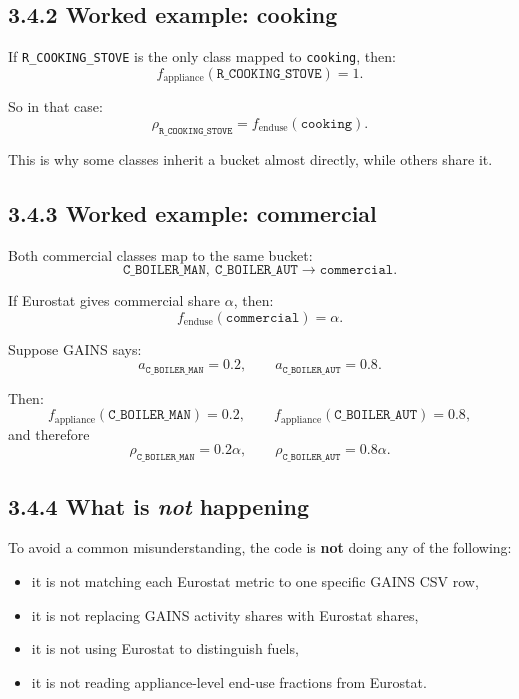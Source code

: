 \documentclass[11pt,a4paper]{article}
\begin{document}
\subsection{3.4.2 Worked example: cooking}

If \texttt{R\_COOKING\_STOVE} is the only class mapped to \texttt{cooking}, then:
\[
f_{\mathrm{appliance}}(\texttt{R\_COOKING\_STOVE}) = 1.
\]

So in that case:
\[
\rho_{\texttt{R\_COOKING\_STOVE}}
= f_{\mathrm{enduse}}(\texttt{cooking}).
\]

This is why some classes inherit a bucket almost directly, while others share it.

\subsection{3.4.3 Worked example: commercial}

Both commercial classes map to the same bucket:
\[
\texttt{C\_BOILER\_MAN},\ \texttt{C\_BOILER\_AUT}
\rightarrow \texttt{commercial}.
\]

If Eurostat gives commercial share $\alpha$, then:
\[
f_{\mathrm{enduse}}(\texttt{commercial}) = \alpha.
\]

Suppose GAINS says:
\[
a_{\texttt{C\_BOILER\_MAN}} = 0.2,
\qquad
a_{\texttt{C\_BOILER\_AUT}} = 0.8.
\]

Then:
\[
f_{\mathrm{appliance}}(\texttt{C\_BOILER\_MAN}) = 0.2,
\qquad
f_{\mathrm{appliance}}(\texttt{C\_BOILER\_AUT}) = 0.8,
\]
and therefore
\[
\rho_{\texttt{C\_BOILER\_MAN}} = 0.2\alpha,
\qquad
\rho_{\texttt{C\_BOILER\_AUT}} = 0.8\alpha.
\]

\subsection{3.4.4 What is \emph{not} happening}

To avoid a common misunderstanding, the code is \textbf{not} doing any of the following:

\begin{itemize}[leftmargin=1.4em]
  \item it is not matching each Eurostat metric to one specific GAINS CSV row,
  \item it is not replacing GAINS activity shares with Eurostat shares,
  \item it is not using Eurostat to distinguish fuels,
  \item it is not reading appliance-level end-use fractions from Eurostat.
\end{itemize}
\end{document}
